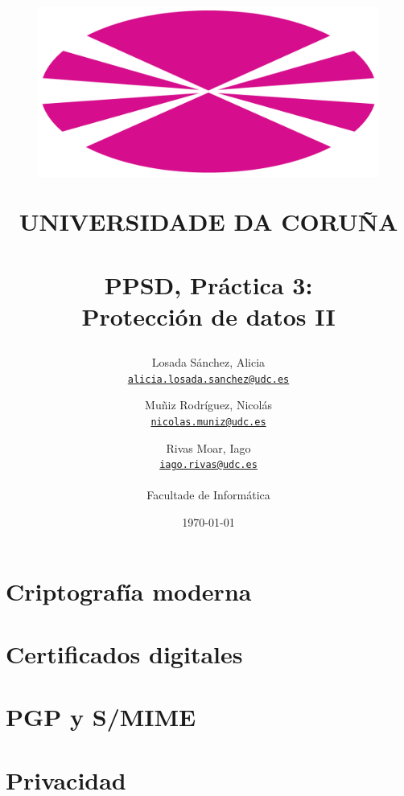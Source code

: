 \documentclass[12pt,a4paper]{article}
\title{
    \begin{figure}[htbp!]
        \begin{center}
        \includegraphics[scale=0.4]{UDC.png}       %
        \end{center}
        \label{fig:udc}
    \end{figure}

    \textsf{UNIVERSIDADE DA CORUÑA \\}
    \textbf{\\ PPSD, Práctica 3: \\ Protección de datos II}
}
\author{
    Losada Sánchez, Alicia\\
    \texttt{\href{mailto:alicia.losada.sanchez@udc.es}{alicia.losada.sanchez@udc.es}}
    \and
    Muñiz Rodríguez, Nicolás\\
    \texttt{\href{mailto:nicolas.muniz@udc.es}{nicolas.muniz@udc.es}}
    \and
    Rivas Moar, Iago\\
    \texttt{\href{mailto:iago.rivas@udc.es}{iago.rivas@udc.es}}
    \\ \\
    Facultade de Informática
}
\date{\today}
\begin{document}
\maketitle

\thispagestyle{empty}

\newpage
{}

\section{Criptografía moderna}





\section{Certificados digitales}



\section{PGP y S/MIME}







\section{Privacidad}






\end{document}
